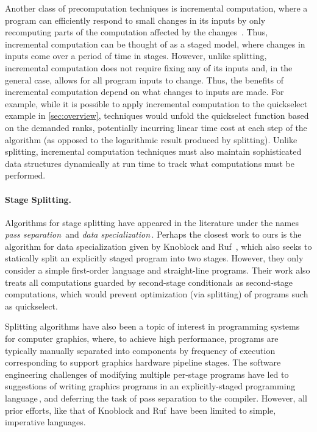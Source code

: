 Another class of precomputation techniques is incremental computation,
where a program can efficiently respond to small changes in its inputs
by only recomputing parts of the computation affected by the
changes~\cite{DemersReTe81,PughTe89,RamalingamRe93,AcarBlBlHaTa09}.
Thus, incremental computation can be thought of as a staged model,
where changes in inputs come over a period of time in stages.
However, unlike splitting, incremental computation does not require
fixing any of its inputs and, in the general case, allows for all
program inputs to change. Thus, the benefits of incremental
computation depend on what changes to inputs are made. For example,
while it is possible to apply incremental computation to the
quickselect example in \ref{sec:overview}, techniques would unfold the
quickselect function based on the demanded ranks, potentially
incurring linear time cost at each step of the algorithm (as opposed
to the logarithmic result produced by splitting).  Unlike splitting,
incremental computation techniques must also maintain sophisticated
data structures dynamically at run time to track what computations
must be performed.

\paragraph{Stage Splitting.}

Algorithms for stage splitting have appeared in the literature under
the names {\em pass separation}\,\cite{JS86-staging} and {\em data
  specialization}\,\cite{knoblock96}.  Perhaps the closest work to
ours is the algorithm for data specialization given by Knoblock and
Ruf~\cite{knoblock96}, which also seeks to statically split an
explicitly staged program into two stages.  However, they only
consider a simple first-order language and straight-line
programs. Their work also treats all computations guarded by
second-stage conditionals as second-stage computations, which would
prevent optimization (via splitting) of programs such as quickselect.

Splitting algorithms have also been a topic of interest in programming
systems for computer graphics, where, to achieve high performance,
programs are typically manually separated into components by frequency
of execution corresponding to support graphics hardware pipeline
stages. The software engineering challenges of modifying multiple
per-stage programs have led to suggestions of writing graphics
programs in an explicitly-staged programming
language\,\cite{Proudfoot:2001,Foley:2011,He:2014}, and deferring the
task of pass separation to the compiler. However, all prior efforts,
like that of Knoblock and Ruf\,\cite{knoblock96} have been limited to
simple, imperative languages.


